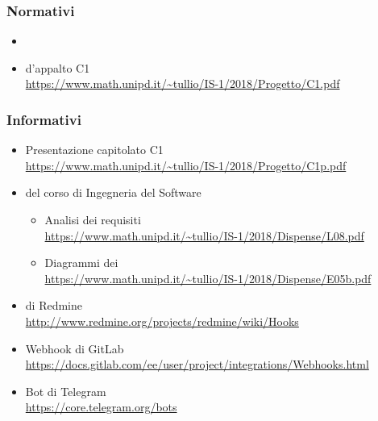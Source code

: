 	\subsubsection{Normativi}
	\begin{itemize}
		\item \Doc{\NdPv}
		\item {} d'appalto C1\\
		\url{https://www.math.unipd.it/~tullio/IS-1/2018/Progetto/C1.pdf}
	\end{itemize}

	\subsubsection{Informativi} \label{sec:RiferimentiInformativi}
	\begin{itemize}
		\item Presentazione capitolato C1\\
		\url{https://www.math.unipd.it/~tullio/IS-1/2018/Progetto/C1p.pdf}
		\item {} del corso di Ingegneria del Software
		\begin{itemize}
			\item Analisi dei requisiti\\
			\url{https://www.math.unipd.it/~tullio/IS-1/2018/Dispense/L08.pdf}
			\item Diagrammi dei \\
			\url{https://www.math.unipd.it/~tullio/IS-1/2018/Dispense/E05b.pdf}
		\end{itemize}
		\item {} di Redmine\\
		\url{http://www.redmine.org/projects/redmine/wiki/Hooks}
		\item Webhook di GitLab\\
		\url{https://docs.gitlab.com/ee/user/project/integrations/Webhooks.html}
		\item Bot di Telegram\\
		\url{https://core.telegram.org/bots}
	\end{itemize}